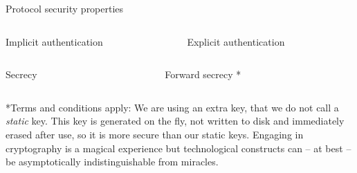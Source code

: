 \begin{frame}[fragile,T]{Protocol security properties}
  \small

  \vspace{.2em}
  \begin{columns}[t,fullwidth]
    \begin{column}{.44\linewidth}
      \begin{block}{Implicit authentication}
      \end{block}
    \end{column}

    \hfill

    \begin{column}{.54\linewidth}
      \begin{block}{Explicit authentication}
      \end{block}
    \end{column}
  \end{columns}


  \vspace{2em}
  \begin{columns}[t,fullwidth]
    \begin{column}{.54\linewidth}
      \begin{block}{Secrecy}
      \end{block}
    \end{column}
    \hfill
    \begin{column}{.44\linewidth}
      \begin{block}{Forward secrecy}
       *
      \end{block}
    \end{column}
  \end{columns}

  \vspace{1.5em}
  \footnotesize
  *Terms and conditions apply: We are using an extra key, that we do not call a \emph{static} key. This key is generated on the fly,
  not written to disk and immediately erased after use, so it is more secure than our static keys. Engaging in cryptography is a magical
  experience but technological constructs can – at best – be asymptotically indistinguishable from miracles.

\end{frame}



